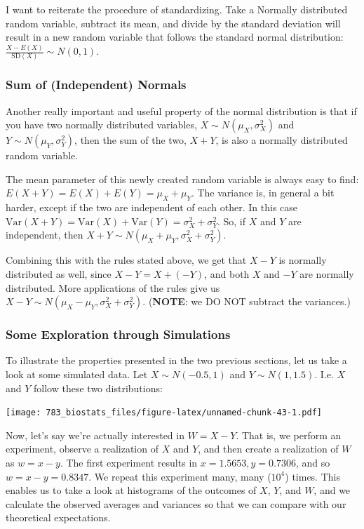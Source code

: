 \documentclass[]{book}
\theoremstyle{definition}
\theoremstyle{definition}
\theoremstyle{definition}
\theoremstyle{remark}
\begin{document}
I want to reiterate the procedure of standardizing. Take a Normally distributed random variable, subtract its mean, and divide by the standard deviation will result in a new random variable that follows the standard normal distribution: \(\frac{X - E(X)}{\text{SD}(X)} \sim N(0,1)\).

\hypertarget{sum-of-independent-normals}{%
\subsubsection{Sum of (Independent) Normals}\label{sum-of-independent-normals}}

Another really important and useful property of the normal distribution is that if you have two normally distributed variables, \(X \sim N(\mu_X, \sigma_X^2)\) and \(Y \sim N(\mu_Y, \sigma_Y^2)\), then the sum of the two, \(X + Y\), is also a normally distributed random variable.

The mean parameter of this newly created random variable is always easy to find: \(E(X + Y) = E(X) + E(Y) = \mu_X + \mu_Y\). The variance is, in general a bit harder, except if the two are independent of each other. In this case \(\text{Var}(X + Y) = \text{Var}(X) + \text{Var}(Y) = \sigma_X^2 + \sigma_Y^2\). So, if \(X\) and \(Y\) are independent, then \(X + Y \sim N(\mu_X + \mu_Y, \sigma_X^2 + \sigma_Y^2)\).

Combining this with the rules stated above, we get that \(X - Y\) is normally distributed as well, since \(X - Y = X + (-Y)\), and both \(X\) and \(-Y\) are normally distributed. More applications of the rules give us \(X - Y \sim N(\mu_X - \mu_Y, \sigma_X^2 + \sigma_Y^2)\). (\textbf{NOTE}: we DO NOT subtract the variances.)

\hypertarget{some-exploration-through-simulations}{%
\subsubsection{Some Exploration through Simulations}\label{some-exploration-through-simulations}}

To illustrate the properties presented in the two previous sections, let us take a look at some simulated data. Let \(X \sim N(-0.5, 1)\) and \(Y \sim N(1, 1.5)\). I.e. \(X\) and \(Y\) follow these two distributions:

\texttt{[image: 783\_biostats\_files/figure-latex/unnamed-chunk-43-1.pdf]}

Now, let's say we're actually interested in \(W = X - Y\). That is, we perform an experiment, observe a realization of \(X\) and \(Y\), and then create a realization of \(W\) as \(w = x - y\). The first experiment results in \(x = 1.5653, y = 0.7306\), and so \(w = x - y = 0.8347\). We repeat this experiment many, many (\(\ensuremath{10^{4}}\)) times. This enables us to take a look at histograms of the outcomes of \(X\), \(Y\), and \(W\), and we calculate the observed averages and variances so that we can compare with our theoretical expectations.
\end{document}

